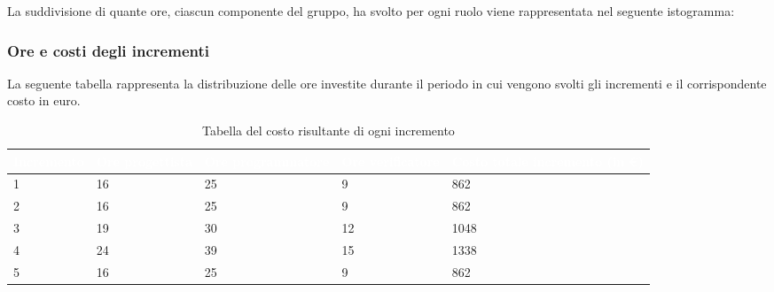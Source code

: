 La suddivisione di quante ore, ciascun componente del gruppo, ha svolto per ogni ruolo viene rappresentata nel seguente istogramma:
\begin{center}
	\pgfplotsset{width=17cm, height=8.5cm}
\end{center}
\clearpage

\subsubsection{Ore e costi degli incrementi}
La seguente tabella rappresenta la distribuzione delle ore investite durante il periodo in cui vengono svolti gli incrementi e il corrispondente costo in euro.


{
\renewcommand{\arraystretch}{1.65}
\centering
\begin{longtable}{ C{2.1cm} C{2.7cm} C{3cm} C{3cm} C{3.3cm} }
\caption{Tabella del costo risultante di ogni incremento}\\
\textcolor{white}{\textbf{Incremento}} & 
\textcolor{white}{\textbf{Ore progettista}} &
\textcolor{white}{\textbf{Ore programmatore}}&
\textcolor{white}{\textbf{Ore verificatore}}&
\textcolor{white}{\textbf{Costo totale incremento (in \euro{})}}\\
\endhead


1 & 16 & 25 & 9 & 862\\
2 & 16 & 25 & 9 & 862\\
3 & 19 & 30 & 12 & 1048\\
4 & 24 & 39 & 15 & 1338\\
5 & 16 & 25 & 9  & 862\\



\end{longtable}
}



